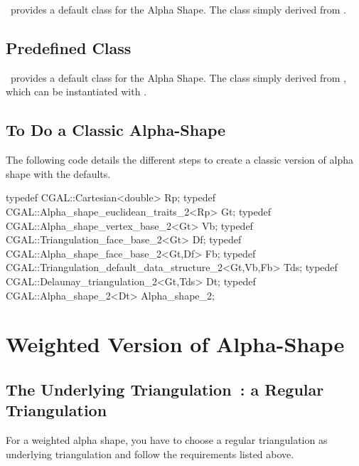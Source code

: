 \cgal\ provides a default  class
for the Alpha Shape. The class
 simply derived from 
.


\subsection*{Predefined \protect {} Class}

\cgal\ provides a default  class
for the Alpha Shape. The class
 simply derived from 
, which can be instantiated with .



\subsection*{To Do a Classic Alpha-Shape}

\ccExample
The following code details the different steps to create 
a classic version of alpha shape with the defaults.

\begin{cprog}
typedef CGAL::Cartesian<double> Rp;
typedef CGAL::Alpha_shape_euclidean_traits_2<Rp> Gt;
typedef CGAL::Alpha_shape_vertex_base_2<Gt> Vb;
typedef CGAL::Triangulation_face_base_2<Gt> Df;
typedef CGAL::Alpha_shape_face_base_2<Gt,Df> Fb;
typedef CGAL::Triangulation_default_data_structure_2<Gt,Vb,Fb> Tds;
typedef CGAL::Delaunay_triangulation_2<Gt,Tds> Dt;
typedef CGAL::Alpha_shape_2<Dt> Alpha_shape_2;
\end{cprog}


\section{Weighted Version of Alpha-Shape\label{I1_SectWeightedAS}}

\subsection*{The Underlying Triangulation~: a Regular Triangulation}

For a weighted alpha shape, you have to choose a regular triangulation as
underlying triangulation  and follow the requirements listed above.

